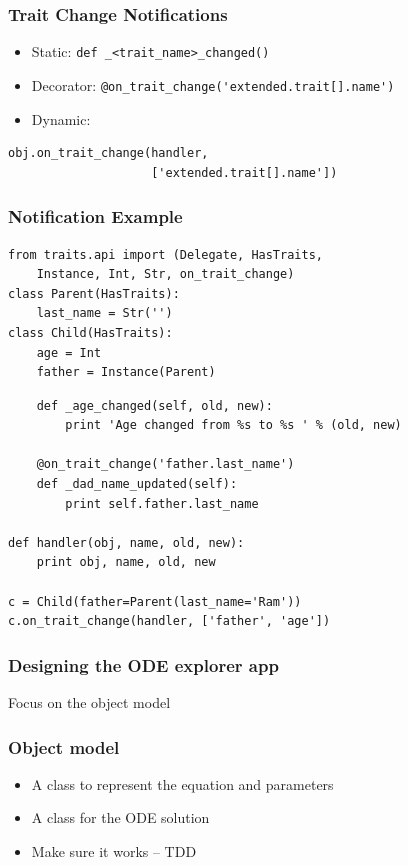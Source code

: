 \documentclass[14pt,compress]{beamer}
\newcommand{\typ}[1]{\lstinline{#1}}
\newcommand{\myemph}[1]{\structure{\emph{#1}}}
\begin{document}
\begin{frame}
    \frametitle{Trait Change Notifications}
    \vspace*{-6pt}
    \small
    \begin{itemize}
        \item Static: \typ{def _<trait_name>_changed()}
        \item Decorator: \typ{@on_trait_change('extended.trait[].name')}
        \item Dynamic:
    \end{itemize}
\begin{lstlisting}
obj.on_trait_change(handler, 
                    ['extended.trait[].name'])
\end{lstlisting}
\end{frame}

\begin{frame}
  \frametitle{Notification Example}
\vspace*{-8pt}
\footnotesize
\begin{lstlisting}
from traits.api import (Delegate, HasTraits, 
    Instance, Int, Str, on_trait_change)
class Parent(HasTraits):
    last_name = Str('') 
class Child(HasTraits):
    age = Int
    father = Instance(Parent)
\end{lstlisting}
\pause
\begin{lstlisting}
    def _age_changed(self, old, new):
        print 'Age changed from %s to %s ' % (old, new)

    @on_trait_change('father.last_name')
    def _dad_name_updated(self):
        print self.father.last_name

def handler(obj, name, old, new):
    print obj, name, old, new

c = Child(father=Parent(last_name='Ram'))
c.on_trait_change(handler, ['father', 'age'])

\end{lstlisting}
\end{frame}


\begin{frame}
  \frametitle{Designing the ODE explorer app}
  \Large
\begin{center}
    \pause
    \myemph{Think!}

    \vspace*{1in}
    Focus on the object model
\end{center}
\end{frame}

\begin{frame}
  \frametitle{Object model}
  \begin{itemize}
      \item A class to represent the equation and parameters
      \item A class for the ODE solution
      \item Make sure it works -- TDD
 \end{itemize}
\end{frame}
\end{document}
